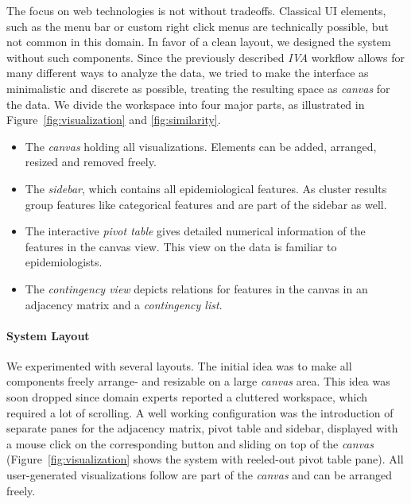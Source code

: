 \documentclass[journal]{style/vgtc} 			          %
\begin{document}
The focus on web technologies is not without tradeoffs.
%
Classical UI elements, such as the menu bar or custom right click menus are technically possible, but not common in this domain.
%
In favor of a clean layout, we designed the system without such components.
%
Since the previously described \emph{IVA} workflow allows for many different ways to analyze the data, we tried to make the interface as minimalistic and discrete as possible, treating the resulting space as \emph{canvas} for the data.
%
We divide the workspace into four major parts, as illustrated in Figure~\ref{fig:visualization} and \ref{fig:similarity}.
\begin{itemize}
	\item The \emph{canvas} holding all visualizations. Elements can be added, arranged, resized and removed freely.
	\item The \emph{sidebar}, which contains all epidemiological features. As cluster results group features like categorical features and are part of the sidebar as well.
	\item The interactive \emph{pivot table} gives detailed numerical information of the features in the canvas view. This view on the data is familiar to epidemiologists.
	\item The \emph{contingency view} depicts relations for features in the canvas in an adjacency matrix and a \emph{contingency list}.
\end{itemize}

\paragraph{System Layout}
We experimented with several layouts.
%
The initial idea was to make all components freely arrange- and resizable on a large \emph{canvas} area.
%
This idea was soon dropped since domain experts reported a cluttered workspace, which required a lot of scrolling.
%
A well working configuration was the introduction of separate panes for the adjacency matrix, pivot table and sidebar, displayed with a mouse click on the corresponding button and sliding on top of the \emph{canvas} (Figure~\ref{fig:visualization} shows the system with reeled-out pivot table pane).
%
All user-generated visualizations follow are part of the \emph{canvas} and can be arranged freely.
\end{document}
